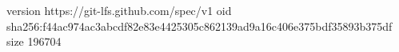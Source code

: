 version https://git-lfs.github.com/spec/v1
oid sha256:f44ac974ac3abcdf82e83e4425305c862139ad9a16c406e375bdf35893b375df
size 196704
